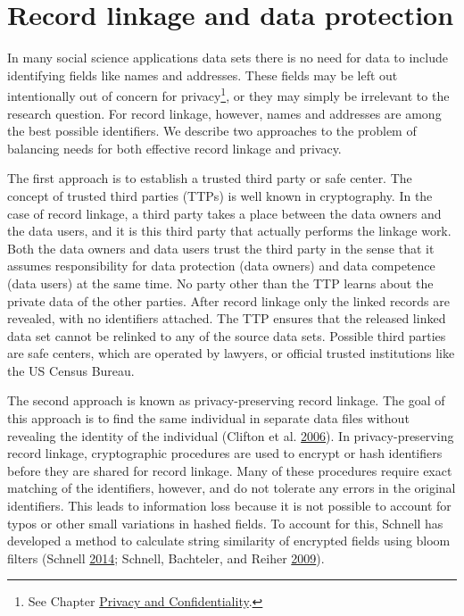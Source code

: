 \documentclass[]{krantz}
\begin{document}
\section{Record linkage and data
protection}\label{record-linkage-and-data-protection}

In many social science applications data sets there is no need for data
to include identifying fields like names and addresses. These fields may
be left out intentionally out of concern for privacy\footnote{See
  Chapter \protect\hyperlink{chap:privacy}{Privacy and Confidentiality}.},
or they may simply be irrelevant to the research question. For record
linkage, however, names and addresses are among the best possible
identifiers. We describe two approaches to the problem of balancing
needs for both effective record linkage and privacy.

The first approach is to establish a trusted third party or safe center.
The concept of trusted third parties (TTPs) is well known in
cryptography. In the case of record linkage, a third party takes a place
between the data owners and the data users, and it is this third party
that actually performs the linkage work. Both the data owners and data
users trust the third party in the sense that it assumes responsibility
for data protection (data owners) and data competence (data users) at
the same time. No party other than the TTP learns about the private data
of the other parties. After record linkage only the linked records are
revealed, with no identifiers attached. The TTP ensures that the
released linked data set cannot be relinked to any of the source data
sets. Possible third parties are safe centers, which are operated by
lawyers, or official trusted institutions like the US Census Bureau.

The second approach is known as privacy-preserving record linkage. The
goal of this approach is to find the same individual in separate data
files without revealing the identity of the individual (Clifton et al.
\protect\hyperlink{ref-Clifton06}{2006}). In privacy-preserving record
linkage, cryptographic procedures are used to encrypt or hash
identifiers before they are shared for record linkage. Many of these
procedures require exact matching of the identifiers, however, and do
not tolerate any errors in the original identifiers. This leads to
information loss because it is not possible to account for typos or
other small variations in hashed fields. To account for this, Schnell
has developed a method to calculate string similarity of encrypted
fields using bloom filters (Schnell
\protect\hyperlink{ref-schnell2014efficient}{2014}; Schnell, Bachteler,
and Reiher \protect\hyperlink{ref-schnell2009privacy}{2009}).
\end{document}

